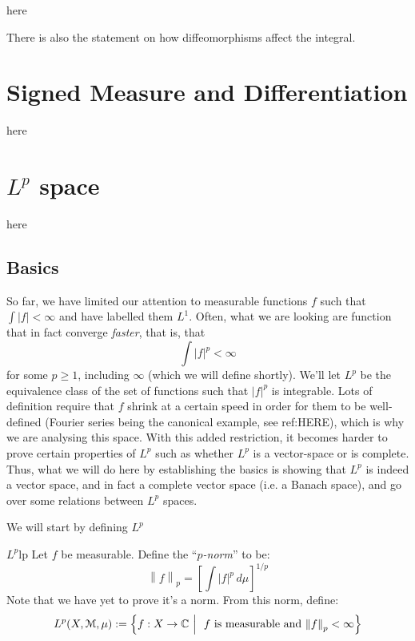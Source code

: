 \documentclass[oneside]{book}
\renewcommand{\C}{\mathbb{C}}
\newcommand{\EM}{\EuScript{M}}
\newcommand{\set}[2]{\left\{#1 \ \middle|\ #2\right\}}
\newcommand{\rw}{\rightarrow}
\begin{document}
\begin{Proof}
	here
\end{Proof}

There is also the statement on how diffeomorphisms affect the integral. 



\chapter{Signed Measure and Differentiation}

here


\chapter[Lp sapce]{$L^p$ space}

here

\section{Basics}

So far, we have limited our attention to measurable functions $f$ such that $\int |f| < \infty$ and have labelled them
$L^1$. Often, what we are looking are function that in fact converge \emph{faster}, that is, that
\[
	\int |f|^p < \infty
\]
for some $p \ge 1$, including $\infty$ (which we will define shortly). We'll let $L^p$ be the equivalence class of the set of functions such that
$|f|^p$ is integrable. Lots of definition require that $f$ shrink at a certain speed in order for them to be
well-defined (Fourier series being the canonical example, see ref:HERE), which is why we are analysing this space. With this added restriction, it becomes harder
to prove certain properties of $L^p$ such as whether $L^p$ is a vector-space or is complete. Thus, what we will do here
by establishing the basics is showing that $L^p$ is indeed a vector space, and in fact a complete vector space (i.e.
a Banach space), and go over some relations between $L^p$ spaces. 


We will start by defining $L^p$ 

\begin{defn}{$L^p$}{lp}
	Let $f$ be measurable. Define the ``\emph{$p$-norm}'' to be:
	\[
		\left\| f\right\|_p = \left[\int |f|^p\, d\mu\right]^{1/p}
	\]
	Note that we have yet to prove it's a norm. From this norm, define:
	\[
		L^p(X, \EM, \mu) := \set{f: X \rw \C}{\text{ $f$ is measurable and $\left\| f\right\|_p < \infty$}}
	\]
\end{defn}
\end{document}
